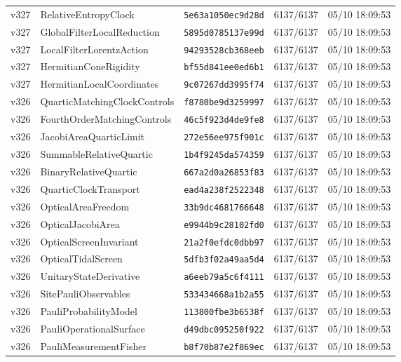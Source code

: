 \documentclass[11pt]{article}
\theoremstyle{definition}\newtheorem{deriv}{Derivation}
\begin{document}
{\begin{longtable}{@{}lllll@{}}
v327 & RelativeEntropyClock & \texttt{5e63a1050ec9d28d} & 6137/6137 & 05/10 18:09:53 \\
v327 & GlobalFilterLocalReduction & \texttt{5895d0785137e99d} & 6137/6137 & 05/10 18:09:53 \\
v327 & LocalFilterLorentzAction & \texttt{94293528cb368eeb} & 6137/6137 & 05/10 18:09:53 \\
v327 & HermitianConeRigidity & \texttt{bf55d841ee0ed6b1} & 6137/6137 & 05/10 18:09:53 \\
v327 & HermitianLocalCoordinates & \texttt{9c07267dd3995f74} & 6137/6137 & 05/10 18:09:53 \\
v326 & QuarticMatchingClockControls & \texttt{f8780be9d3259997} & 6137/6137 & 05/10 18:09:53 \\
v326 & FourthOrderMatchingControls & \texttt{46c5f923d4de9fe8} & 6137/6137 & 05/10 18:09:53 \\
v326 & JacobiAreaQuarticLimit & \texttt{272e56ee975f901c} & 6137/6137 & 05/10 18:09:53 \\
v326 & SummableRelativeQuartic & \texttt{1b4f9245da574359} & 6137/6137 & 05/10 18:09:53 \\
v326 & BinaryRelativeQuartic & \texttt{667a2d0a26853f83} & 6137/6137 & 05/10 18:09:53 \\
v326 & QuarticClockTransport & \texttt{ead4a238f2522348} & 6137/6137 & 05/10 18:09:53 \\
v326 & OpticalAreaFreedom & \texttt{33b9dc4681766648} & 6137/6137 & 05/10 18:09:53 \\
v326 & OpticalJacobiArea & \texttt{e9944b9c28102fd0} & 6137/6137 & 05/10 18:09:53 \\
v326 & OpticalScreenInvariant & \texttt{21a2f0efdc0dbb97} & 6137/6137 & 05/10 18:09:53 \\
v326 & OpticalTidalScreen & \texttt{5dfb3f02a49aa5d4} & 6137/6137 & 05/10 18:09:53 \\
v326 & UnitaryStateDerivative & \texttt{a6eeb79a5c6f4111} & 6137/6137 & 05/10 18:09:53 \\
v326 & SitePauliObservables & \texttt{533434668a1b2a55} & 6137/6137 & 05/10 18:09:53 \\
v326 & PauliProbabilityModel & \texttt{113800fbe3b6538f} & 6137/6137 & 05/10 18:09:53 \\
v326 & PauliOperationalSurface & \texttt{d49dbc095250f922} & 6137/6137 & 05/10 18:09:53 \\
v326 & PauliMeasurementFisher & \texttt{b8f70b87e2f869ec} & 6137/6137 & 05/10 18:09:53 \\

\end{longtable}}
\end{document}
